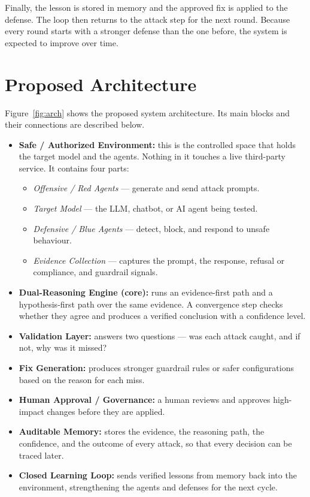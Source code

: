 Finally, the lesson is stored in memory and the approved fix is applied to the
defense. The loop then returns to the attack step for the next round. Because
every round starts with a stronger defense than the one before, the system is
expected to improve over time.

\section{Proposed Architecture}

Figure~\ref{fig:arch} shows the proposed system architecture. Its main blocks
and their connections are described below.


\begin{itemize}
  \item \textbf{Safe / Authorized Environment:} this is the controlled space that
  holds the target model and the agents. Nothing in it touches a live third-party
  service. It contains four parts:
  \begin{itemize}
    \item \emph{Offensive / Red Agents} --- generate and send attack prompts.
    \item \emph{Target Model} --- the LLM, chatbot, or AI agent being tested.
    \item \emph{Defensive / Blue Agents} --- detect, block, and respond to unsafe
    behaviour.
    \item \emph{Evidence Collection} --- captures the prompt, the response,
    refusal or compliance, and guardrail signals.
  \end{itemize}
  \item \textbf{Dual-Reasoning Engine (core):} runs an evidence-first path and a
  hypothesis-first path over the same evidence. A convergence step checks whether
  they agree and produces a verified conclusion with a confidence level.
  \item \textbf{Validation Layer:} answers two questions --- was each attack
  caught, and if not, why was it missed?
  \item \textbf{Fix Generation:} produces stronger guardrail rules or safer
  configurations based on the reason for each miss.
  \item \textbf{Human Approval / Governance:} a human reviews and approves
  high-impact changes before they are applied.
  \item \textbf{Auditable Memory:} stores the evidence, the reasoning path, the
  confidence, and the outcome of every attack, so that every decision can be
  traced later.
  \item \textbf{Closed Learning Loop:} sends verified lessons from memory back
  into the environment, strengthening the agents and defenses for the next cycle.
\end{itemize}

